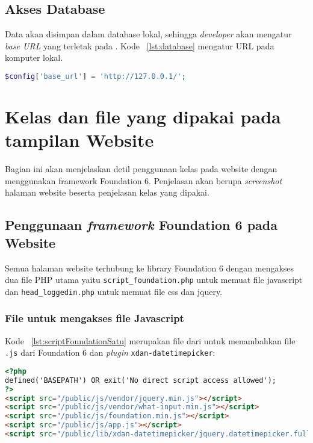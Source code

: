\subsection{Akses Database}
Data akan disimpan dalam database lokal, sehingga \textit{developer} akan mengatur \textit{base URL} yang terletak pada . Kode ~\ref{lst:database} mengatur URL pada komputer lokal.\\

\begin{lstlisting}[style=customphp, language=PHP, caption=Setting database lokal,  basicstyle=\footnotesize\ttfamily, frame=single,
columns=fullflexible, keepspaces=true, breaklines=true, showstringspaces=false, label={lst:database}]
$config['base_url'] = 'http://127.0.0.1/';
\end{lstlisting}

\section{Kelas dan file yang dipakai pada tampilan Website}
Bagian ini akan menjelaskan detil penggunaan kelas pada website dengan menggunakan framework Foundation 6. Penjelasan akan berupa \textit{screenshot} halaman website beserta penjelasan kelas yang dipakai. \\

\subsection{Penggunaan \textit{framework} Foundation 6 pada Website}
Semua halaman website terhubung ke library Foundation 6 dengan mengakses dua file PHP utama yaitu \texttt{script\_foundation.php} untuk memuat file javascript dan \texttt{head\_loggedin.php} untuk memuat file css dan jquery.\\


\subsubsection{File untuk mengakses file Javascript}
\noindent Kode ~\ref{lst:scriptFoundationSatu} merupakan file dari  untuk menambahkan file \texttt{.js} dari Foundation 6 dan \textit{plugin} \texttt{xdan-datetimepicker}:
\begin{lstlisting}[style=customhtml, language=HTML, caption=Penambahan library js, basicstyle=\footnotesize\ttfamily, frame=single,
columns=fullflexible, keepspaces=true, breaklines=true, showstringspaces=false, label={lst:scriptFoundationSatu}]
<?php
defined('BASEPATH') OR exit('No direct script access allowed');
?>
<script src="/public/js/vendor/jquery.min.js"></script>
<script src="/public/js/vendor/what-input.min.js"></script>
<script src="/public/js/foundation.min.js"></script>
<script src="/public/js/app.js"></script>
<script src="/public/lib/xdan-datetimepicker/jquery.datetimepicker.full.min.js"></script>
\end{lstlisting}

